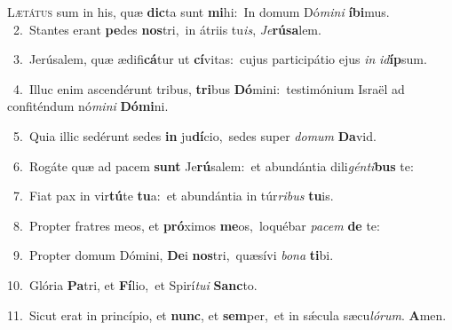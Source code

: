 \lettrine{\initial\textcolor{\initialcolor}{L}}{ætátus} sum in his, quæ \textbf{dic}\-ta sunt \textbf{mi}\-hi:~\star In domum Dó\-\textit{mi}\-\textit{ni} \textbf{í}\-\textbf{bi}mus.\\
{\numbfont\textcolor{\numbcolor}{~2.}}~Stantes erant \textbf{pe}\-des \textbf{nos}\-tri,~\star in átriis tu\-\textit{is}\-, \textit{Je}\-\textbf{rú}\textbf{sa}lem.\par
{\numbfont\textcolor{\numbcolor}{~3.}}~Jerúsalem, quæ ædifi\-\textbf{cá}\-tur ut \textbf{cí}\-vitas:~\star cujus participátio ejus \textit{in} \textit{id}\-\textbf{íp}sum.\par
{\numbfont\textcolor{\numbcolor}{~4.}}~Illuc enim ascendérunt tribus, \textbf{tri}\-bus \textbf{Dó}\-mini:~\star testimónium Israël ad confiténdum nó\-\textit{mi}\-\textit{ni} \textbf{Dó}\-\textbf{mi}ni.\par
{\numbfont\textcolor{\numbcolor}{~5.}}~Quia illic sedérunt sedes \textbf{in} ju\-\textbf{dí}\-cio,~\star sedes super \textit{do}\-\textit{mum} \textbf{Da}\-vid.\par
{\numbfont\textcolor{\numbcolor}{~6.}}~Rogáte quæ ad pacem \textbf{sunt} Je\-\textbf{rú}\-salem:~\star et abundántia dili\-\textit{gén}\-\textit{ti}\textbf{bus} te:\par
{\numbfont\textcolor{\numbcolor}{~7.}}~Fiat pax in vir\-\textbf{tú}\-te \textbf{tu}\-a:~\star et abundántia in túr\-\textit{ri}\-\textit{bus} \textbf{tu}\-is.\par
{\numbfont\textcolor{\numbcolor}{~8.}}~Propter fratres meos, et \textbf{pró}\-ximos \textbf{me}\-os,~\star loquébar \textit{pa}\-\textit{cem} \textbf{de} te:\par
{\numbfont\textcolor{\numbcolor}{~9.}}~Propter domum Dómini, \textbf{De}\-i \textbf{nos}\-tri,~\star quæsívi \textit{bo}\-\textit{na} \textbf{ti}\-bi.\par
{\numbfont\textcolor{\numbcolor}{10.}}~Glória \textbf{Pa}\-tri, et \textbf{Fí}\-lio,~\star et Spirí\-\textit{tu}\-\textit{i} \textbf{Sanc}\-to.\par
{\numbfont\textcolor{\numbcolor}{11.}}~Sicut erat in princípio, et \textbf{nunc}\-, et \textbf{sem}\-per,~\star et in sǽcula sæcu\-\textit{ló}\-\textit{rum}. \textbf{A}\-men.\par
